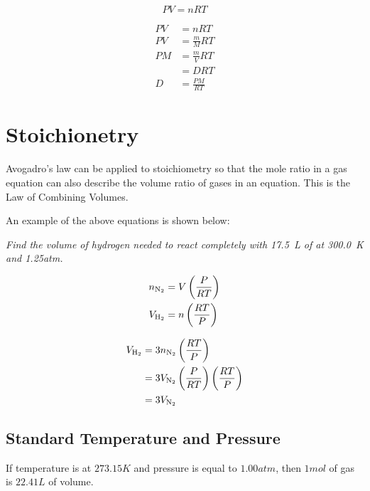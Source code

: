 \begin{equation}
  PV=nRT
\end{equation}

\begin{equation}
\begin{split}
  PV & =nRT\\
  PV & =\frac{m}{M}RT\\
  PM & =\frac{m}{V}RT\\
  & =DRT\\
  D & =\frac{PM}{RT}
\end{split}
\end{equation}

\section{Stoichionetry}

Avogadro's law can be applied to stoichiometry so that the mole ratio in a gas
equation can also describe the volume ratio of gases in an equation. This is the
Law of Combining Volumes.

An example of the above equations is shown below:

\textit{Find the volume of hydrogen needed to react completely with
\SI{17.5}{\liter} of  at \SI{300.0}{\kelvin} and 1.25atm.}


\begin{equation}
\begin{split}
  n_{\ce{N2}} &= V\left(\frac{P}{RT}\right)\\
  V_{\ce{H2}} &= n\left(\frac{RT}{P}\right)\\
\end{split}
\end{equation}

\begin{equation}
\begin{split}
  V_{\ce{H2}} &= 3n_{\ce{N2}}\left(\frac{RT}{P}\right)\\
  &= 3V_{\ce{N2}}\left(\frac{P}{RT}\right)\left(\frac{RT}{P}\right)\\
  &= 3V_{\ce{N2}}
\end{split}
\end{equation}

\subsection{Standard Temperature and Pressure}
If temperature is at $273.15K$ and pressure is equal to $1.00atm$, then $1mol$
of gas is $22.41L$ of volume.

